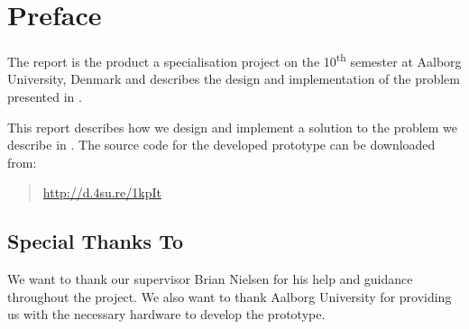 \section*{Preface}\label{sec:preface}
The report is the product a specialisation project on the 10\textsuperscript{th} semester at Aalborg University, Denmark and describes the design and implementation of the problem presented in .

This report describes how we design and implement a solution to the problem we describe in . The source code for the developed prototype can be downloaded from:
\begin{quote}
  \url{http://d.4su.re/1kpIt}
\end{quote}

\subsection*{Special Thanks To}
We want to thank our supervisor Brian Nielsen for his help and guidance throughout the project. We also want to thank Aalborg University for providing us with the necessary hardware to develop the prototype.


